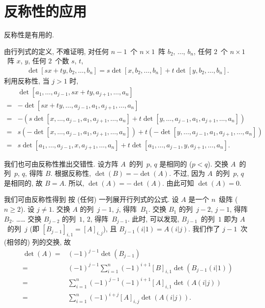 \documentclass[../libro.tex]{subfiles}
\begin{document}
\section{反称性的应用}

反称性是有用的.

由行列式的定义, 不难证明,
对任何 \(n-1\)~个 \(n \times 1\)~阵
\(b_2\), \(\dots\), \(b_n\),
任何 \(2\)~个 \(n \times 1\)~阵 \(x\), \(y\),
任何 \(2\)~个数 \(s\), \(t\),
\begin{align*}
    \det {[sx + ty, b_2, \dots, b_n]}
    = s \det {[x, b_2, \dots, b_n]}
    + t \det {[y, b_2, \dots, b_n]}.
\end{align*}
利用反称性, 当 \(j > 1\) 时,
\begin{align*}
    &
    \det
    {[a_1, \dots, a_{j-1}, sx + ty, a_{j+1}, \dots, a_n]}
    \\
    = {} &
    {-}
    \det {[sx + ty, \dots, a_{j-1}, a_1, a_{j+1}, \dots, a_n]}
    \\
    = {} &
    {-}
    (
        s \det {[x, \dots, a_{j-1}, a_1, a_{j+1}, \dots, a_n]}
        + t \det {[y, \dots, a_{j-1}, a_1, a_{j+1}, \dots, a_n]}
    )
    \\
    = {} &
    s(-\det {[x, \dots, a_{j-1}, a_1, a_{j+1}, \dots, a_n]})
    + t(-\det {[y, \dots, a_{j-1}, a_1, a_{j+1}, \dots, a_n]})
    \\
    = {} &
    s \det {[a_1, \dots, a_{j-1}, x, a_{j+1}, \dots, a_n]}
    + t \det {[a_1, \dots, a_{j-1}, y, a_{j+1}, \dots, a_n]}.
\end{align*}

我们也可由反称性推出交错性.
设方阵 \(A\)~的列~\(p\), \(q\) 是相同的 (\(p < q\)).
交换 \(A\)~的列~\(p\), \(q\), 得阵 \(B\).
根据反称性, \(\det {(B)} = -\det {(A)}\).
不过, 因为 \(A\)~的列~\(p\), \(q\) 是相同的,
故 \(B = A\).
所以, \(\det {(A)} = -\det {(A)}\).
由此可知 \(\det {(A)} = 0\).

我们可由反称性得到%
按 (任何) 一列展开行列式的公式.
设 \(A\) 是一个 \(n\)~级阵 (\(n \geq 2\)).
设 \(j \neq 1\).
交换 \(A\) 的列~\(j-1\), \(j\), 得阵~\(B_1\).
交换 \(B_1\) 的列~\(j-2\), \(j-1\), 得阵~\(B_2\).
……
交换 \(B_{j-2}\) 的列~\(1\), \(2\), 得阵~\(B_{j-1}\).
此时, 可以发现,
\(B_{j-1}\)~的列~\(1\) 即为 \(A\)~的列~\(j\)
(即 \([B_{j-1}]_{i,1} = [A]_{i,j}\)),
且 \(B_{j-1}(i|1) = A(i|j)\).
我们作了 \(j-1\)~次 (相邻的) 列的交换,
故
\begin{align*}
    \det {(A)}
    = {} & (-1)^{j-1} \det {(B_{j-1})}
    \\
    = {} & (-1)^{j-1} \sum_{i = 1}^{n}
    {(-1)^{i+1} [B]_{i,1} \det {(B_{j-1}(i|1))}}
    \\
    = {} & \sum_{i = 1}^{n}
    {(-1)^{j-1} (-1)^{i+1} [A]_{i,1} \det {(A(i|j))}}
    \\
    = {} & \sum_{i = 1}^{n}
    {(-1)^{i+j} [A]_{i,j} \det {(A(i|j))}}.
\end{align*}
\end{document}
